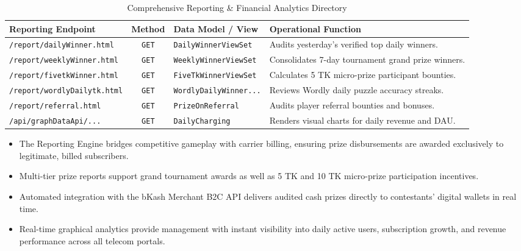 \begin{table}[htbp]
\centering
\footnotesize
\begin{tabular}{|p{4.2cm}|c|p{3.2cm}|p{6.4cm}|}
\hline
\rowcolor{primaryBlue!15}
\textbf{Reporting Endpoint} & \textbf{Method} & \textbf{Data Model / View} & \textbf{Operational Function} \\ \hline
\texttt{/report/dailyWinner.html} & \texttt{GET} & \texttt{DailyWinnerViewSet} & Audits yesterday's verified top daily winners. \\ \hline
\texttt{/report/weeklyWinner.html} & \texttt{GET} & \texttt{WeeklyWinnerViewSet} & Consolidates 7-day tournament grand prize winners. \\ \hline
\texttt{/report/fivetkWinner.html} & \texttt{GET} & \texttt{FiveTkWinnerViewSet} & Calculates 5 TK micro-prize participant bounties. \\ \hline
\texttt{/report/wordlyDailytk.html}& \texttt{GET} & \texttt{WordlyDailyWinner...}& Reviews Wordly daily puzzle accuracy streaks. \\ \hline
\texttt{/report/referral.html} & \texttt{GET} & \texttt{PrizeOnReferral} & Audits player referral bounties and bonuses. \\ \hline
\texttt{/api/graphDataApi/...} & \texttt{GET} & \texttt{DailyCharging} & Renders visual charts for daily revenue and DAU. \\ \hline
\end{tabular}
\caption{Comprehensive Reporting \& Financial Analytics Directory}
\end{table}

\begin{tcolorbox}[summarybox, title={Chapter Key Takeaways}]
\begin{itemize}
    \item The Reporting Engine bridges competitive gameplay with carrier billing, ensuring prize disbursements are awarded exclusively to legitimate, billed subscribers.
    \item Multi-tier prize reports support grand tournament awards as well as 5 TK and 10 TK micro-prize participation incentives.
    \item Automated integration with the bKash Merchant B2C API delivers audited cash prizes directly to contestants' digital wallets in real time.
    \item Real-time graphical analytics provide management with instant visibility into daily active users, subscription growth, and revenue performance across all telecom portals.
\end{itemize}
\end{tcolorbox}
